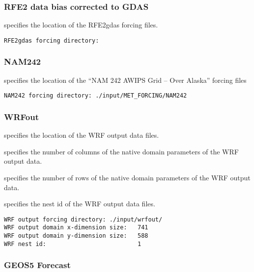  
 \subsubsection{RFE2 data bias corrected to GDAS} \label{sssec:rfe2gdas}
 

 
  specifies the location of the
 RFE2gdas forcing files.
 

 \begin{Verbatim}[frame=single]
RFE2gdas forcing directory:
 \end{Verbatim}

 
 \subsubsection{NAM242} \label{sssec:supp_nam242}
 

 
  specifies the location of the
 ``NAM 242 AWIPS Grid -- Over Alaska'' forcing files
 

 \begin{Verbatim}[frame=single]
NAM242 forcing directory: ./input/MET_FORCING/NAM242
 \end{Verbatim}

 
 \subsubsection{WRFout} \label{sssec:supp_wrfout}
 

 
  specifies the location of the
 WRF output data files.

  specifies the number of
 columns of the native domain parameters of the WRF output data.

  specifies the number of
 rows of the native domain parameters of the WRF output data.

  specifies the nest id of the WRF output data files. 
 

 \begin{Verbatim}[frame=single]
WRF output forcing directory: ./input/wrfout/
WRF output domain x-dimension size:   741
WRF output domain y-dimension size:   588
WRF nest id:                          1
 \end{Verbatim}

 
 \subsubsection{GEOS5 Forecast} \label{sssec:geos5forecast}
 

